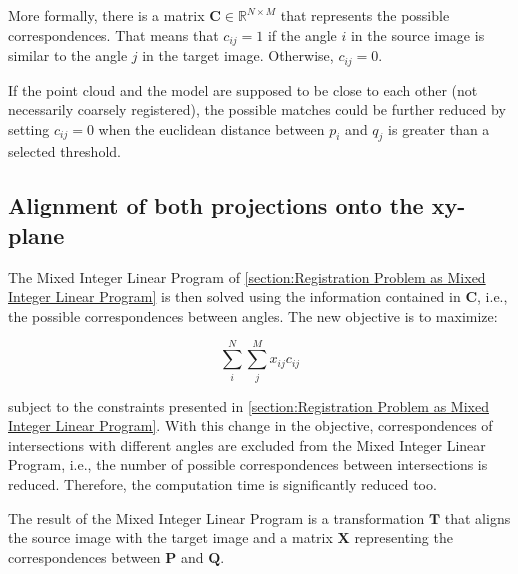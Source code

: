             More formally, there is a matrix $\pmb{C} \in \mathbb{R}^{N \times M}$ that represents the possible correspondences.
            That means that $c_{ij} = 1$ if the angle $i$ in the source image is similar to the angle $j$ in the target image.
            Otherwise, $c_{ij} = 0$.

            If the point cloud and the model are supposed to be close to each other (not necessarily coarsely registered),
            the possible matches could be further reduced by setting $c_{ij} = 0$ when the euclidean distance between $p_i$
            and $q_j$ is greater than a selected threshold.

        \subsection{Alignment of both projections onto the xy-plane}
            \label{sub:Alignment of both projections onto the xy-plane}

            The Mixed Integer Linear Program of \autoref{section:Registration Problem as Mixed Integer Linear Program} is then solved using the information contained in $\pmb{C}$, 
            i.e., the possible correspondences between angles. The new objective is to maximize:

            \begin{equation}
                \label{eq:objective_angles}
                \sum_{i}^{N} \sum_{j}^{M} x_{ij} c_{ij} 
            \end{equation}    

            subject to the constraints presented in \autoref{section:Registration Problem as Mixed Integer Linear Program}.
            With this change in the objective, correspondences of intersections with different angles are excluded from the Mixed Integer Linear Program, 
            i.e., the number of possible correspondences between intersections is reduced. 
            Therefore, the computation time is significantly reduced too.

            The result of the Mixed Integer Linear Program is a transformation $\pmb{T}$ that aligns the source image with the target image
            and a matrix $\pmb{X}$ representing the correspondences between $\pmb{P}$ and $\pmb{Q}$.

